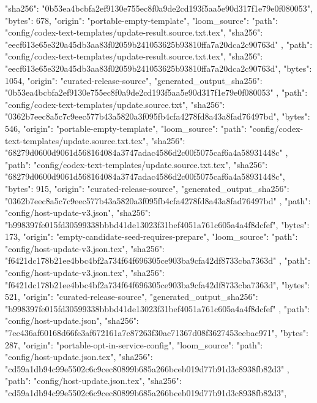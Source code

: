 {{      "sha256": "0b53ea4bcbfa2ef9130e755ec8f0a9de2cd193f5aa5e90d317f1e79e0f080053",
      "bytes": 678,
      "origin": "portable-empty-template",
      "loom_source": {
        "path": "config/codex-text-templates/update-result.source.txt.tex",
        "sha256": "eecf613e65e320a45db3aa83f02059b241053625b93810ffa7a20dca2c90763d"
      }
    },
    {
      "path": "config/codex-text-templates/update-result.source.txt.tex",
      "sha256": "eecf613e65e320a45db3aa83f02059b241053625b93810ffa7a20dca2c90763d",
      "bytes": 1054,
      "origin": "curated-release-source",
      "generated_output_sha256": "0b53ea4bcbfa2ef9130e755ec8f0a9de2cd193f5aa5e90d317f1e79e0f080053"
    },
    {
      "path": "config/codex-text-templates/update.source.txt",
      "sha256": "0362b7eec8a5c7c9eec577b43a5820a3f095fb4cfa4278fd8a43a8fad76497bd",
      "bytes": 546,
      "origin": "portable-empty-template",
      "loom_source": {
        "path": "config/codex-text-templates/update.source.txt.tex",
        "sha256": "68279d0600d9061d568164084a3747adac4586d2c00f5075caf6a4a58931448c"
      }
    },
    {
      "path": "config/codex-text-templates/update.source.txt.tex",
      "sha256": "68279d0600d9061d568164084a3747adac4586d2c00f5075caf6a4a58931448c",
      "bytes": 915,
      "origin": "curated-release-source",
      "generated_output_sha256": "0362b7eec8a5c7c9eec577b43a5820a3f095fb4cfa4278fd8a43a8fad76497bd"
    },
    {
      "path": "config/host-update-v3.json",
      "sha256": "b998397fe015fd30599338bbbd41de13023f31bef4051a761c605a4a4f8dcfef",
      "bytes": 173,
      "origin": "empty-candidate-seed-requires-prepare",
      "loom_source": {
        "path": "config/host-update-v3.json.tex",
        "sha256": "f6421dc178b21ee4bbc4bf2a734f64f696305ce903ba9cfa42df8733cba7363d"
      }
    },
    {
      "path": "config/host-update-v3.json.tex",
      "sha256": "f6421dc178b21ee4bbc4bf2a734f64f696305ce903ba9cfa42df8733cba7363d",
      "bytes": 521,
      "origin": "curated-release-source",
      "generated_output_sha256": "b998397fe015fd30599338bbbd41de13023f31bef4051a761c605a4a4f8dcfef"
    },
    {
      "path": "config/host-update.json",
      "sha256": "7ec436af60168d66fe3af672161a7c87263f30ac71367d08f3627453eebac971",
      "bytes": 287,
      "origin": "portable-opt-in-service-config",
      "loom_source": {
        "path": "config/host-update.json.tex",
        "sha256": "cd59a1db94c99e5502c6c9cec80899b685a266bceb019d77b91d3c8938fb82d3"
      }
    },
    {
      "path": "config/host-update.json.tex",
      "sha256": "cd59a1db94c99e5502c6c9cec80899b685a266bceb019d77b91d3c8938fb82d3",
}}
